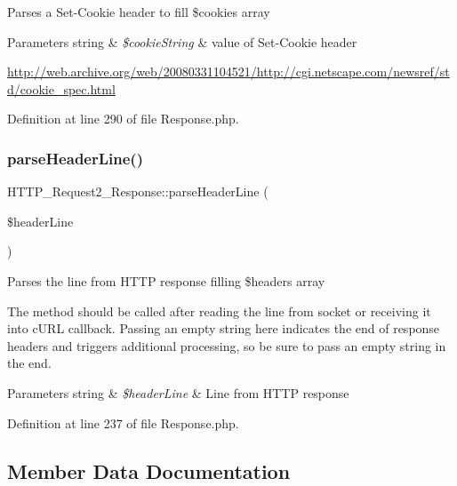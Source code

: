 Parses a Set-\/\+Cookie header to fill \$cookies array


\begin{DoxyParams}[1]{Parameters}
string & {\em \$cookie\+String} & value of Set-\/\+Cookie header\\
\hline
\end{DoxyParams}
\hyperlink{}{http\+://web.\+archive.\+org/web/20080331104521/http\+://cgi.\+netscape.\+com/newsref/std/cookie\+\_\+spec.\+html}

Definition at line 290 of file Response.\+php.

\mbox{\label{classHTTP__Request2__Response_a04cced85d4e024e5f41bb326aeba4bb8}} 
\subsubsection{\texorpdfstring{parse\+Header\+Line()}{parseHeaderLine()}}
{\footnotesize\ttfamily H\+T\+T\+P\+\_\+\+Request2\+\_\+\+Response\+::parse\+Header\+Line (\begin{DoxyParamCaption}\item[{}]{\$header\+Line }\end{DoxyParamCaption})}

Parses the line from H\+T\+TP response filling \$headers array

The method should be called after reading the line from socket or receiving it into c\+U\+RL callback. Passing an empty string here indicates the end of response headers and triggers additional processing, so be sure to pass an empty string in the end.


\begin{DoxyParams}[1]{Parameters}
string & {\em \$header\+Line} & Line from H\+T\+TP response \\
\hline
\end{DoxyParams}


Definition at line 237 of file Response.\+php.



\subsection{Member Data Documentation}
\mbox{\label{classHTTP__Request2__Response_a3f5cdce9656ed7bd31859b5778169f66}} 

